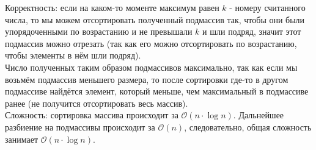 \documentclass[a4paper,12pt]{article} %
\begin{document}
Корректность: если на каком-то моменте максимум равен $ k $ - номеру считанного числа, то мы можем отсортировать полученный подмассив так, чтобы они были упорядоченными по возрастанию и не превышали $k$ и шли подряд, значит этот подмассив можно отрезать (так как его можно отсортировать по возрастанию, чтобы элементы в нём шли подряд).\\
Число полученных таким образом подмассивов максимально, так как если мы возьмём подмассив меньшего размера, то после сортировки где-то в другом подмассиве найдётся элемент, который меньше, чем максимальный в подмассиве ранее (не получится отсортировать весь массив).\\

Сложность: сортировка массива происходит за $\mathcal{O}(n \cdot \log n)$. Дальнейшее разбиение на подмассивы происходит за $ \mathcal{O}(n) $, следовательно, общая сложность занимает $\mathcal{O}(n \cdot \log n)$.
\end{document}
